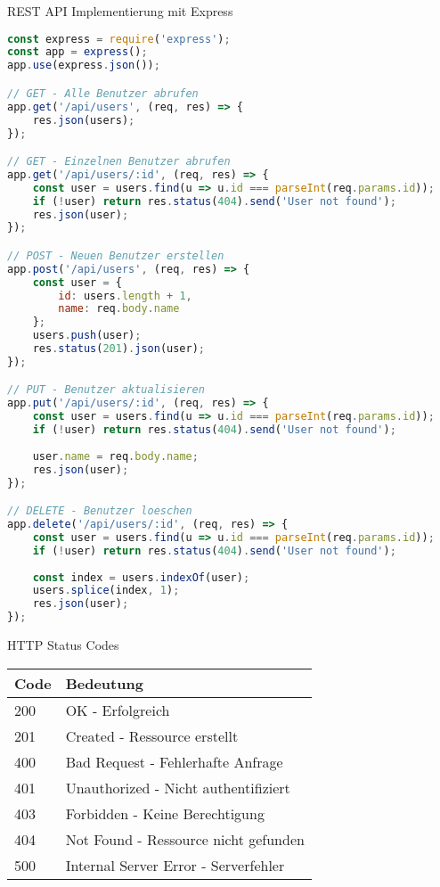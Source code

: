 \begin{KR}{REST API Implementierung mit Express}
\begin{lstlisting}[language=JavaScript, style=basesmol]
const express = require('express');
const app = express();
app.use(express.json());

// GET - Alle Benutzer abrufen
app.get('/api/users', (req, res) => {
    res.json(users);
});

// GET - Einzelnen Benutzer abrufen
app.get('/api/users/:id', (req, res) => {
    const user = users.find(u => u.id === parseInt(req.params.id));
    if (!user) return res.status(404).send('User not found');
    res.json(user);
});

// POST - Neuen Benutzer erstellen
app.post('/api/users', (req, res) => {
    const user = {
        id: users.length + 1,
        name: req.body.name
    };
    users.push(user);
    res.status(201).json(user);
});

// PUT - Benutzer aktualisieren
app.put('/api/users/:id', (req, res) => {
    const user = users.find(u => u.id === parseInt(req.params.id));
    if (!user) return res.status(404).send('User not found');
    
    user.name = req.body.name;
    res.json(user);
});

// DELETE - Benutzer loeschen
app.delete('/api/users/:id', (req, res) => {
    const user = users.find(u => u.id === parseInt(req.params.id));
    if (!user) return res.status(404).send('User not found');
    
    const index = users.indexOf(user);
    users.splice(index, 1);
    res.json(user);
});
\end{lstlisting}
\end{KR}

\begin{corollary}{HTTP Status Codes}
    \begin{center}
    \begin{tabular}{|l|l|}
    \hline
    Code & Bedeutung \\
    \hline
    200 & OK - Erfolgreich \\
    \hline
    201 & Created - Ressource erstellt \\
    \hline
    400 & Bad Request - Fehlerhafte Anfrage \\
    \hline
    401 & Unauthorized - Nicht authentifiziert \\
    \hline
    403 & Forbidden - Keine Berechtigung \\
    \hline
    404 & Not Found - Ressource nicht gefunden \\
    \hline
    500 & Internal Server Error - Serverfehler \\
    \hline
    \end{tabular}
    \end{center}
\end{corollary}
